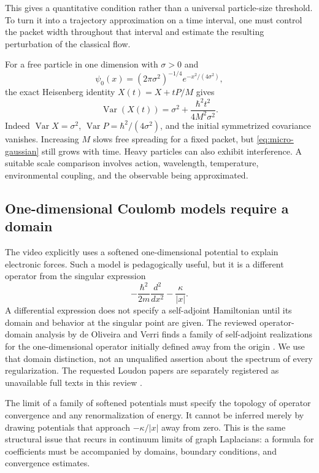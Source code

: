 This gives a quantitative condition rather than a universal particle-size
threshold.  To turn it into a trajectory approximation on a time interval,
one must control the packet width throughout that interval and estimate
the resulting perturbation of the classical flow.

For a free particle in one dimension with $\sigma>0$ and
\[
 \psi_0(x)=(2\pi\sigma^2)^{-1/4}
             e^{-x^2/(4\sigma^2)},
\]
the exact Heisenberg identity $X(t)=X+tP/M$ gives
\begin{equation}
 \operatorname{Var}(X(t))
 =\sigma^2+\frac{\hbar^2t^2}{4M^2\sigma^2}.
 \label{eq:micro-gaussian}
\end{equation}
Indeed $\operatorname{Var}X=\sigma^2$,
$\operatorname{Var}P=\hbar^2/(4\sigma^2)$, and the initial
symmetrized covariance vanishes.  Increasing $M$ slows free spreading
for a fixed packet, but \eqref{eq:micro-gaussian} still grows with time.
Heavy particles can also exhibit interference.  A suitable scale
comparison involves action, wavelength, temperature, environmental
coupling, and the observable being approximated.

\subsection{One-dimensional Coulomb models require a domain}

The video explicitly uses a softened one-dimensional potential to explain
electronic forces.  Such a model is pedagogically useful, but it is a
different operator from the singular expression
\[
 -\frac{\hbar^2}{2m}\frac{d^2}{dx^2}-\frac{\kappa}{|x|}.
\]
A differential expression does not specify a self-adjoint Hamiltonian
until its domain and behavior at the singular point are given.
The reviewed operator-domain analysis by de Oliveira and Verri finds a
family of self-adjoint realizations for the one-dimensional operator
initially defined away from the origin
\citep{microOliveiraVerri2009}.  We use that domain distinction, not
an unqualified assertion about the spectrum of every regularization.
The requested Loudon papers are separately registered as unavailable
full texts in this review \citep{microLoudon1959,microLoudon2016}.

The limit of a family of softened potentials must specify the topology
of operator convergence and any renormalization of energy.  It cannot
be inferred merely by drawing potentials that approach $-\kappa/|x|$
away from zero.  This is the same structural issue that recurs in
continuum limits of graph Laplacians: a formula for coefficients must be
accompanied by domains, boundary conditions, and convergence estimates.

